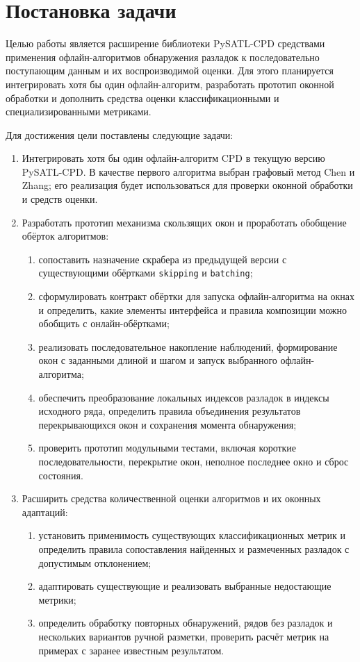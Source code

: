 \section{Постановка задачи}

Целью работы является расширение библиотеки PySATL-CPD средствами
применения офлайн-алгоритмов обнаружения разладок к последовательно
поступающим данным и их воспроизводимой оценки.
Для этого планируется интегрировать хотя бы один офлайн-алгоритм,
разработать прототип оконной обработки и дополнить средства оценки
классификационными и специализированными метриками.

Для достижения цели поставлены следующие задачи:
\begin{enumerate}
    \item Интегрировать хотя бы один офлайн-алгоритм CPD
    в текущую версию PySATL-CPD. В качестве первого алгоритма
    выбран графовый метод Chen и Zhang; его реализация будет
    использоваться для проверки оконной обработки и средств оценки.

    \item Разработать прототип механизма скользящих окон
    и проработать обобщение обёрток алгоритмов:
    \begin{enumerate}
        \item сопоставить назначение скрабера из предыдущей версии
        с существующими обёртками \texttt{skipping} и \texttt{batching};
        \item сформулировать контракт обёртки для запуска
        офлайн-алгоритма на окнах и определить, какие элементы интерфейса
        и правила композиции можно обобщить с онлайн-обёртками;
        \item реализовать последовательное накопление наблюдений,
        формирование окон с заданными длиной и шагом
        и запуск выбранного офлайн-алгоритма;
        \item обеспечить преобразование локальных индексов разладок
        в индексы исходного ряда, определить правила объединения
        результатов перекрывающихся окон и сохранения момента обнаружения;
        \item проверить прототип модульными тестами, включая короткие
        последовательности, перекрытие окон, неполное последнее окно
        и сброс состояния.
    \end{enumerate}

    \item Расширить средства количественной оценки
    алгоритмов и их оконных адаптаций:
    \begin{enumerate}
        \item установить применимость существующих классификационных метрик
        и определить правила сопоставления найденных
        и размеченных разладок с допустимым отклонением;
        \item адаптировать существующие и реализовать выбранные
        недостающие метрики;
        \item определить обработку повторных обнаружений,
        рядов без разладок и нескольких вариантов ручной разметки,
        проверить расчёт метрик на примерах с заранее известным результатом.
    \end{enumerate}


\end{enumerate}
